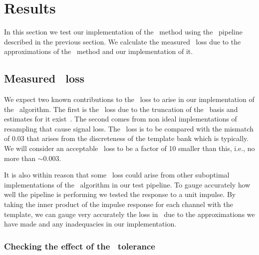 \section{Results}
\label{SECIV}\label{sec:results}

In this section we test our implementation of the \lloid\ method using the \gstreamer\
pipeline described in the previous section.  We calculate the measured \SNR\
loss due to the approximations of the \lloid\ method and our implementation of
it.
%
%
%


\subsection{Measured \SNR\ loss}

We expect two known contributions to the \SNR\ loss to arise in our
implementation of the \lloid\ algorithm.  The first is the \SNR\ loss due to
the truncation of the \SVD\ basis and estimates for it
exist~\cite{Cannon:2010p10398}.  The second comes from non ideal
implementations of resampling that cause signal loss.  The \SNR\ loss is to be compared
with the mismatch of 0.03 that arises from the discreteness of the
template bank which is typically.  We will consider an acceptable
\SNR\ loss to be a factor of 10 smaller than this, i.e., no more than $\sim$0.003.

It is also within reason that some \SNR\ loss could arise from other suboptimal
implementations of the \lloid\ algorithm in our test pipeline.  To gauge
accurately how well the pipeline is performing we tested the response to a
unit impulse.  By taking the inner product of the impulse response for each channel
with the template, we can gauge very accurately the loss in
\SNR\ due to the approximations we have made and any inadequacies in
our implementation.

\subsubsection{Checking the effect of the \SVD\ tolerance}

